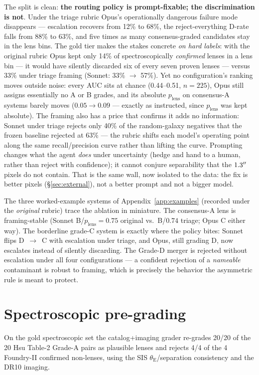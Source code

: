 \documentclass[11pt,letterpaper]{article}
\newcommand{\plens}{\ensuremath{p_{\mathrm{lens}}}}
\newcommand{\thetaE}{\ensuremath{\theta_{\mathrm{E}}}}
\newcommand{\spectroHsu}{20/20}      %
\newcommand{\spectroNon}{4/4}        %
\begin{document}
The split is clean: \textbf{the routing policy is prompt-fixable; the
discrimination is not}. Under the triage rubric Opus's operationally dangerous
failure mode disappears --- escalation recovers from 12\% to 68\%, the
reject-everything D-rate falls from 88\% to 63\%, and five times as many
consensus-graded candidates stay in the lens bins. The gold tier makes the
stakes concrete \emph{on hard labels}: with the original rubric Opus kept only
14\% of spectroscopically \emph{confirmed} lenses in a lens bin --- it would have
silently discarded six of every seven proven lenses --- versus 33\% under triage
framing (Sonnet: 33\% $\to$ 57\%). Yet no configuration's ranking moves outside
noise: every AUC sits at chance (0.44--0.51, $n{=}225$), Opus still assigns
essentially no A or B grades, and its absolute \plens{} on consensus-A systems
barely moves ($0.05 \to 0.09$ --- exactly as instructed, since \plens{} was kept
absolute). The framing also has a price that confirms it adds no information:
Sonnet under triage rejects only 40\% of the random-galaxy negatives that the
frozen baseline rejected at 63\% --- the rubric shifts each model's operating
point along the same recall/precision curve rather than lifting the curve.
Prompting changes what the agent \emph{does} under uncertainty (hedge and hand to
a human, rather than reject with confidence); it cannot conjure separability that
the $1.3^{\prime\prime}$ pixels do not contain. That is the same wall, now isolated to
the data: the fix is better pixels (\S\ref{sec:external}), not a better prompt
and not a bigger model.

The three worked-example systems of Appendix~\ref{app:examples} (recorded under
the \emph{original} rubric) trace the ablation in miniature. The consensus-A lens
is framing-stable (Sonnet B/$\plens{=}0.75$ original vs.\ B/$0.74$ triage; Opus C
either way). The borderline grade-C system is exactly where the policy bites:
Sonnet flips D~$\to$~C with escalation under triage, and Opus, still grading D,
now escalates instead of silently discarding. The Grade-D merger is rejected
without escalation under all four configurations --- a confident rejection of a
\emph{nameable} contaminant is robust to framing, which is precisely the behavior
the asymmetric rule is meant to protect.

\section{Spectroscopic pre-grading}
On the gold spectroscopic set the catalog+imaging grader re-grades \spectroHsu{} of the 20
Hsu Table-2 Grade-A pairs as plausible lenses and rejects \spectroNon{} of the 4 Foundry-II
confirmed non-lenses, using the SIS \thetaE/separation consistency and the DR10 imaging.
\end{document}
